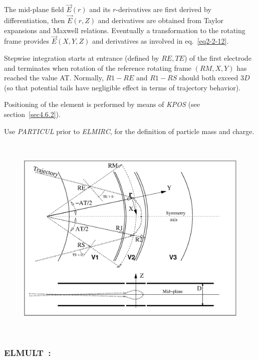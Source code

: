 {\medskip

\noindent  The mid-plane field $ \vec  E(r) $ and its $r$-derivatives are first derived by differentiation, then 
$ \vec  E(r,Z) $ and  derivatives are obtained from Taylor expansions and Maxwell relations. 
Eventually a transformation to the rotating frame provides $\vec  E(X,Y,Z)$ 
 and  derivatives as involved in eq.~\ref{eq2-2-12}. 


\noindent Stepwise integration starts at entrance (defined by $R\!E, T\!E$) of the first electrode 
and terminates when rotation of the reference  rotating frame  $(RM,X,Y)$ has reached the value AT. 
Normally, $R1-R\!E$ and $R1-R\!S$ should both  exceed  $3D$ (so 
 that potential tails  have negligible effect in terms of trajectory behavior).  

\medskip

\noindent Positioning of the element is performed by means of \textsl{KPOS} (see section~\ref{sec4.6.2}). 

\medskip

\noindent Use \textsl{PARTICUL} prior to \textsl{ELMIRC}, for the
 definition of particle mass and charge.

\vfill

\begin{figure}[H]
\centerline{\includegraphics[height=10cm]{FigELMIRC.eps}}
\caption{\label{figELMIRC} \CapELMIRC}
\end{figure}

\vfill


\newpage

\subsubsection*{ELMULT~: \ELMULTTitl} \label{ELMULT}
\medskip

}
